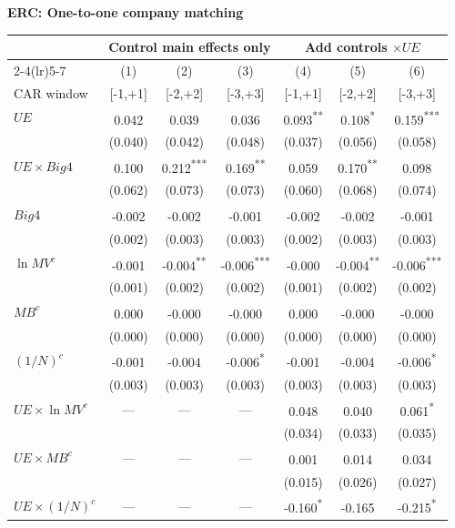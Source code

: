 \documentclass[10pt]{article}
\newcommand{\sym}[1]{\textsuperscript{#1}}
\begin{document}
\noindent\textbf{ERC: One-to-one company matching}\par\medskip
\setlength{\tabcolsep}{4pt}\renewcommand{\arraystretch}{1.12}
\noindent\begin{tabular*}{\textwidth}{@{\extracolsep{\fill}}lcccccc@{}}\toprule
 & \multicolumn{3}{c}{Control main effects only} & \multicolumn{3}{c}{Add controls \(\times UE\)} \\
\cmidrule(lr){2-4}\cmidrule(lr){5-7}
 & (1) & (2) & (3) & (4) & (5) & (6) \\
CAR window & [-1,+1] & [-2,+2] & [-3,+3] & [-1,+1] & [-2,+2] & [-3,+3] \\\midrule
\(UE\) & 0.042\sym{} & 0.039\sym{} & 0.036\sym{} & 0.093\sym{**} & 0.108\sym{*} & 0.159\sym{***} \\
 & (0.040) & (0.042) & (0.048) & (0.037) & (0.056) & (0.058) \\
\(UE\times Big4\) & 0.100\sym{} & 0.212\sym{***} & 0.169\sym{**} & 0.059\sym{} & 0.170\sym{**} & 0.098\sym{} \\
 & (0.062) & (0.073) & (0.073) & (0.060) & (0.068) & (0.074) \\
\(Big4\) & -0.002\sym{} & -0.002\sym{} & -0.001\sym{} & -0.002\sym{} & -0.002\sym{} & -0.001\sym{} \\
 & (0.002) & (0.003) & (0.003) & (0.002) & (0.003) & (0.003) \\
\(\ln MV^c\) & -0.001\sym{} & -0.004\sym{**} & -0.006\sym{***} & -0.000\sym{} & -0.004\sym{**} & -0.006\sym{***} \\
 & (0.001) & (0.002) & (0.002) & (0.001) & (0.002) & (0.002) \\
\(MB^c\) & 0.000\sym{} & -0.000\sym{} & -0.000\sym{} & 0.000\sym{} & -0.000\sym{} & -0.000\sym{} \\
 & (0.000) & (0.000) & (0.000) & (0.000) & (0.000) & (0.000) \\
\((1/N)^c\) & -0.001\sym{} & -0.004\sym{} & -0.006\sym{*} & -0.001\sym{} & -0.004\sym{} & -0.006\sym{*} \\
 & (0.003) & (0.003) & (0.003) & (0.003) & (0.003) & (0.003) \\
\(UE\times\ln MV^c\) & --- & --- & --- & 0.048\sym{} & 0.040\sym{} & 0.061\sym{*} \\
 &  &  &  & (0.034) & (0.033) & (0.035) \\
\(UE\times MB^c\) & --- & --- & --- & 0.001\sym{} & 0.014\sym{} & 0.034\sym{} \\
 &  &  &  & (0.015) & (0.026) & (0.027) \\
\(UE\times(1/N)^c\) & --- & --- & --- & -0.160\sym{*} & -0.165\sym{} & -0.215\sym{*} \\

\end{tabular*}
\end{document}
